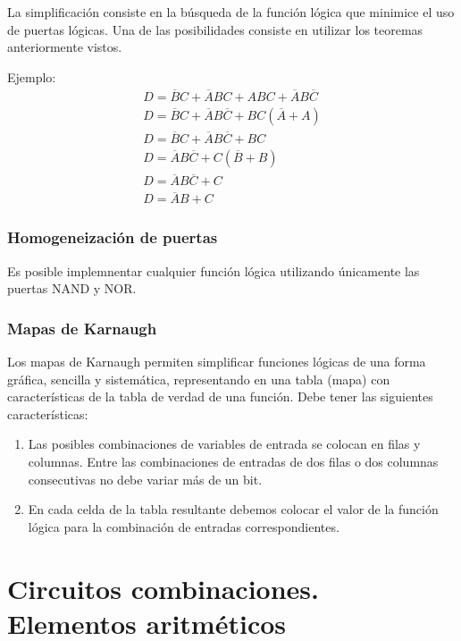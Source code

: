 \documentclass[a4paper, 11pt, titlepage]{article}
\begin{document}
		La simplificación consiste en la búsqueda de la función lógica que minimice el uso 
		de puertas lógicas. Una de las posibilidades consiste en utilizar los teoremas anteriormente 
		vistos.

		Ejemplo:
		\begin{gather*} 
			D = \overline{B}C + \overline{A}BC + ABC + \overline{A}B\overline{C} \\ 
			D = \overline{B}C + \overline{A}B\overline{C} + BC(\overline{A} + A) \\
			D = \overline{B}C + \overline{A}B\overline{C} + BC \\
			D = \overline{A}B\overline{C} + C(\overline{B} + B) \\
			D = \overline{A}B\overline{C} + C \\
			D = \overline{A}B+ C
		\end{gather*}

		\subsubsection{Homogeneización de puertas}

			Es posible implemnentar cualquier función lógica utilizando únicamente las puertas 
			NAND y NOR.
    
		\subsubsection{Mapas de Karnaugh}

			Los mapas de Karnaugh permiten simplificar funciones lógicas de una forma gráfica, sencilla 
			y sistemática, representando en una tabla (mapa) con características de la tabla de verdad de 
			una función. Debe tener las siguientes características:

			\begin{enumerate}
				\item Las posibles combinaciones de variables de entrada se colocan en filas y columnas. 
				Entre las combinaciones de entradas de dos filas o dos columnas consecutivas no debe 
				variar más de un bit.
				\item En cada celda de la tabla resultante debemos colocar el valor de la función lógica 
				para la combinación de entradas correspondientes. 
			\end{enumerate}

\section{Circuitos combinaciones. Elementos aritméticos}
\end{document}

